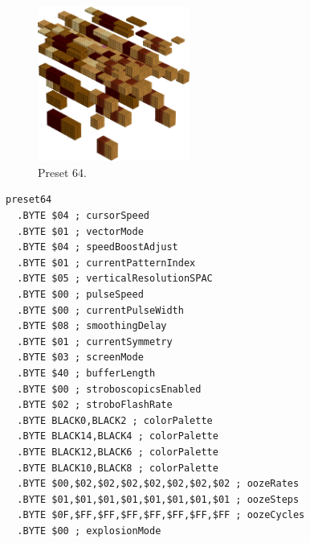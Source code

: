 \begin{minipage}[b]{0.48\linewidth}
\begin{figure}[H]                                                          
  \centering                                                             
  \begin{adjustbox}{width=5cm,center}                                   
  \includegraphics[width=5cm]{src/colorspace_presets/preset64-45.png}%
  \end{adjustbox}                                                        
\caption*{Preset 64.}                                           
\end{figure}                                                               
\end{minipage}
\hspace{0.1cm}
\begin{minipage}[b]{0.48\linewidth}                                       
\begin{lstlisting}[basicstyle=\ttfamily\tiny]
preset64
  .BYTE $04 ; cursorSpeed
  .BYTE $01 ; vectorMode
  .BYTE $04 ; speedBoostAdjust
  .BYTE $01 ; currentPatternIndex
  .BYTE $05 ; verticalResolutionSPAC
  .BYTE $00 ; pulseSpeed
  .BYTE $00 ; currentPulseWidth
  .BYTE $08 ; smoothingDelay
  .BYTE $01 ; currentSymmetry
  .BYTE $03 ; screenMode
  .BYTE $40 ; bufferLength
  .BYTE $00 ; stroboscopicsEnabled
  .BYTE $02 ; stroboFlashRate
  .BYTE BLACK0,BLACK2 ; colorPalette
  .BYTE BLACK14,BLACK4 ; colorPalette
  .BYTE BLACK12,BLACK6 ; colorPalette
  .BYTE BLACK10,BLACK8 ; colorPalette
  .BYTE $00,$02,$02,$02,$02,$02,$02,$02 ; oozeRates
  .BYTE $01,$01,$01,$01,$01,$01,$01,$01 ; oozeSteps
  .BYTE $0F,$FF,$FF,$FF,$FF,$FF,$FF,$FF ; oozeCycles
  .BYTE $00 ; explosionMode
\end{lstlisting}
\end{minipage}

